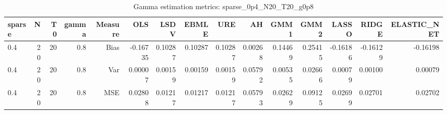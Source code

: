 \begin{table}[!htbp]\centering
\caption{Gamma estimation metrics: sparse_0p4_N20_T20_g0p8}
\label{tab:table1_sparse_0p4_N20_T20_g0p8}
\begin{tabular}{lrrrrrrrrrrrrrr}
\hline
sparse & N & T0 & gamma & Measure & OLS & LSDV & EBMLE & URE & AH & GMM1 & GMM2 & LASSO & RIDGE & ELASTIC_NET \\
\hline
0.4 & 20 & 20 & 0.8 & Bias & -0.16735 & 0.10287 & 0.10287 & 0.10287 & 0.00268 & 0.14469 & 0.25415 & -0.16186 & -0.16129 & -0.16198 \\
0.4 & 20 & 20 & 0.8 & Var & 0.00007 & 0.00159 & 0.00159 & 0.00159 & 0.05792 & 0.00535 & 0.02666 & 0.00079 & 0.00100 & 0.00079 \\
0.4 & 20 & 20 & 0.8 & MSE & 0.02808 & 0.01217 & 0.01217 & 0.01217 & 0.05793 & 0.02629 & 0.09125 & 0.02699 & 0.02701 & 0.02702 \\
\hline
\end{tabular}
\end{table}

